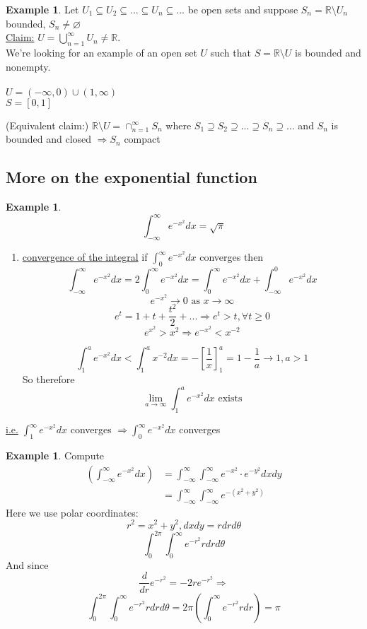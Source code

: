 \documentclass[12pt]{article}
\theoremstyle{plain}
\theoremstyle{definition}
\newtheorem{example}[theorem]{Example}
\begin{document}
\begin{example}
	Let $U_1 \subseteq U_2 \subseteq ... \subseteq U_n \subseteq ...$ be open sets and suppose $S_n = \mathbb{R}\setminus U_n$ bounded, $S_n \neq \varnothing$\\
	\underline{Claim:} $U = \bigcup^\infty_{n=1} U_n \neq \mathbb{R}$.\\
	We're looking for an example of an open set $U$ such that $S=\mathbb{R} \setminus U$ is bounded and nonempty.\\
	\\
	$U = (-\infty, 0) \cup (1, \infty)$\\
	$S = [0,1]$
\end{example}

(Equivalent claim:) $\mathbb{R} \setminus U = \cap^\infty_{n=1} S_n$ where $S_1 \supseteq S_2 \supseteq ... \supseteq S_n \supseteq ...$ and $S_n$ is bounded and closed $\Longrightarrow S_n$ compact

\subsection{More on the exponential function}

\begin{example}
	$$\int^\infty_{-\infty} e^{-x^2} dx = \sqrt{\pi}$$

	\begin{enumerate}
		\item{
		\underline{convergence of the integral}
		if $\int^\infty_{0} e^{-x^2} dx$ converges then
		$$\int^\infty_{-\infty} e^{-x^2} dx = 2 \int^\infty_{0} e^{-x^2} dx = \int^\infty_{0} e^{-x^2} dx + \int^0_{-\infty} e^{-x^2} dx$$
		$$e^{-x^2} \to 0 \text{ as } x \to \infty$$
		$$e^t = 1 + t+  \frac{t^2}{2} + ... \Longrightarrow e^t > t, \forall t \geq 0$$
		$$e^{x^2} > x^2 \Longrightarrow e^{-x^2} < x^{-2}$$
		
		$$\int^a_1e^{-x^2} dx < \int^a_1x^{-2} dx = -[\frac{1}{x}]^a_1 = 1 - \frac{1}{a} \to 1, a > 1$$
		So therefore
		$$\lim_{a\to\infty} \int_1^a e^{-x^2} dx \text{ exists}$$
		}
	\end{enumerate}
	\underline{i.e.} $\int^\infty_{1} e^{-x^2} dx$ converges $\Longrightarrow \int^\infty_{0} e^{-x^2} dx$ converges

\end{example}

\begin{example}
	Compute 
	\begin{align*}
		(\int^\infty_{-\infty} e^{-x^2} dx) &= \int^\infty_{-\infty} \int^\infty_{-\infty} e^{-x^2} \cdot e^{-y^2} dx dy\\
		&= \int^\infty_{-\infty} \int^\infty_{-\infty} e^{-(x^2 + y^2)}
	\end{align*}
	Here we use polar coordinates:
	$$r^2 = x^2 + y^2, dxdy=rdrd\theta$$
	$$\int^{2\pi}_0 \int^\infty_0 e^{-r^2} rdrd\theta$$
	And since
	$$\frac{d}{dr} e^{-r^2} = -2re^{-r^2} \Longrightarrow$$
	$$\int^{2\pi}_0 \int^\infty_0 e^{-r^2} rdrd\theta = 2\pi (\int^\infty_0 e^{-r^2} rdr) = \pi$$

\end{example}
\end{document}
